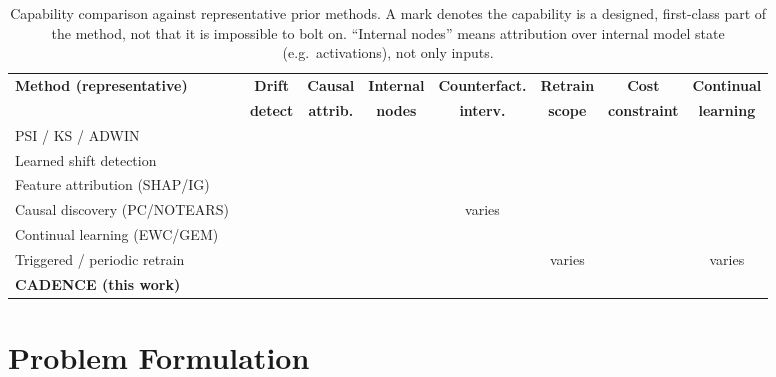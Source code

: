 \documentclass[conference]{IEEEtran}
\newcommand{\yes}{\textcolor{black}{\ding{51}}}
\newcommand{\no}{\textcolor{gray}{\ding{55}}}
\begin{document}
\begin{table}[t]
\centering
\caption{Capability comparison against representative prior methods. A
mark denotes the capability is a designed, first-class part of the method,
not that it is impossible to bolt on. ``Internal nodes'' means attribution
over internal model state (e.g.\ activations), not only inputs.}
\label{tab:matrix}
\renewcommand{\arraystretch}{1.25}
\setlength{\tabcolsep}{4pt}
\begin{tabular}{@{}lccccccc@{}}
\toprule
\textbf{Method (representative)} & \textbf{Drift} & \textbf{Causal} & \textbf{Internal} & \textbf{Counterfact.} & \textbf{Retrain} & \textbf{Cost} & \textbf{Continual}\\
 & \textbf{detect} & \textbf{attrib.} & \textbf{nodes} & \textbf{interv.} & \textbf{scope} & \textbf{constraint} & \textbf{learning}\\
\midrule
PSI / KS / ADWIN~\cite{bifet2007adwin}                     & \yes & \no  & \no  & \no  & \no  & \no  & \no  \\
Learned shift detection~\cite{rabanser2019failing}         & \yes & \no  & \no  & \no  & \no  & \no  & \no  \\
Feature attribution (SHAP/IG)~\cite{lundberg2017shap,sundararajan2017ig} & \no & \no & \no & \no & \no & \no & \no \\
Causal discovery (PC/NOTEARS)~\cite{spirtes2000causation,zheng2018notears} & \no & \yes & \no & varies & \no & \no & \no \\
Continual learning (EWC/GEM)~\cite{kirkpatrick2017ewc,lopezpaz2017gem}     & \no & \no  & \no  & \no  & \yes & \no  & \yes \\
Triggered / periodic retrain~\cite{baylor2017tfx}          & \yes & \no  & \no  & \no  & varies & \no  & varies \\
\textbf{CADENCE (this work)}                               & \yes & \yes & \yes & \yes & \yes & \yes & \yes \\
\bottomrule
\end{tabular}
\end{table}

\section{Problem Formulation}\label{sec:formulation}
\end{document}
